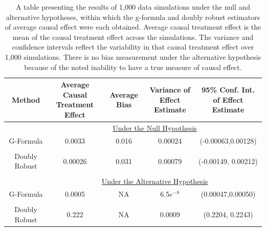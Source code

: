 \begin{table}[h!]
\centering
\begin{tabular}{c | c c c c }
Method & \shortstack{Average Causal \\ Treatment Effect} & Average Bias & \shortstack{Variance of \\ Effect Estimate} & \shortstack{95\% Conf. Int.\\ of Effect Estimate} \\
\hline 
& \multicolumn{4}{c}{\underline{Under the Null Hypothesis}} \\
G-Formula & 0.0033 & 0.016 & 0.00024&(-0.00063,0.00128)\\ \\ 
Doubly Robust & 0.00026 & 0.031& 0.00079 & (-0.00149, 0.00212)\\ \\ 
& \multicolumn{4}{c}{\underline{Under the Alternative Hypothesis}} \\
G-Formula & 0.0005 & NA& 6.5$e^{-8}$ &(0.00047,0.00050) \\ \\ 
Doubly Robust & 0.222 & NA & 0.0009& (0.2204, 0.2243)
\end{tabular} \\
\centering
\caption[Simulation results]{A table presenting the results of 1,000 data simulations under the null and alternative hypotheses, within which the g-formula and doubly robust estimators of average causal effect were each obtained.  Average causal treatment effect is the mean of the causal treatment effect across the simulations.  The variance and confidence intervals reflect the variability in that causal treatment effect over 1,000 simulations. There is no bias measurement under the alternative hypothesis because of the noted inability to have a true measure of causal effect.\label{simdata}}
\end{table}

